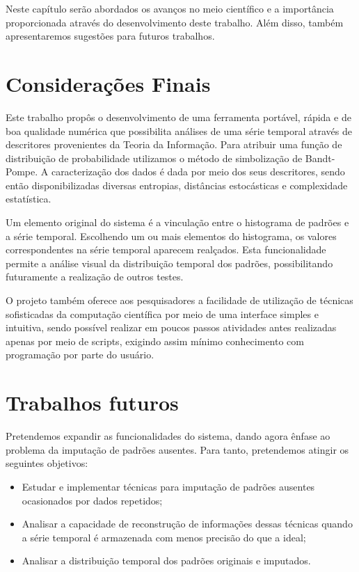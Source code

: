 
Neste capítulo serão abordados os avanços no meio científico e a importância proporcionada através do desenvolvimento deste trabalho. Além disso, também apresentaremos sugestões para futuros trabalhos.

\section{Considerações Finais}

Este trabalho propôs o desenvolvimento de uma ferramenta portável, rápida e de boa qualidade numérica que possibilita análises de uma série temporal através de descritores provenientes da Teoria da Informação. Para atribuir uma função de distribuição de probabilidade utilizamos o método de simbolização de Bandt-Pompe. A caracterização dos dados é dada por meio dos seus descritores, sendo então disponibilizadas diversas entropias, distâncias estocásticas e complexidade estatística.

Um elemento original do sistema é a vinculação entre o histograma de padrões e a série temporal. Escolhendo um ou mais elementos do histograma, os valores correspondentes na série temporal aparecem realçados. Esta funcionalidade permite a análise visual da distribuição temporal dos padrões, possibilitando futuramente a realização de outros testes.

O projeto também oferece aos pesquisadores a facilidade de utilização de técnicas sofisticadas da computação científica por meio de uma interface simples e intuitiva, sendo possível realizar em poucos passos atividades antes realizadas apenas por meio de scripts, exigindo assim mínimo conhecimento com programação por parte do usuário.

\section{Trabalhos futuros}

Pretendemos expandir as funcionalidades do sistema, dando agora ênfase ao problema da imputação de padrões ausentes. Para tanto, pretendemos atingir os seguintes objetivos:

\begin{itemize}
\item Estudar e implementar técnicas para imputação de padrões ausentes ocasionados por dados repetidos;
\item Analisar a capacidade de reconstrução de informações dessas técnicas quando a série temporal é armazenada com menos precisão do que a ideal;
\item Analisar a distribuição temporal dos padrões originais e imputados.
\end{itemize}